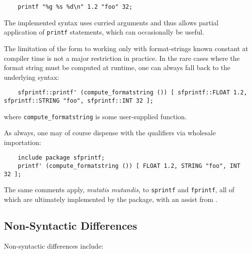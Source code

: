\begin{verbatim}
    printf "%g %s %d\n" 1.2 "foo" 32;
\end{verbatim}

The implemented syntax uses curried arguments and thus allows partial 
application of {\tt printf} statements, which can occasionally be useful.

The limitation of the form to working only with format-strings 
known constant at compiler time is not a major restriction in practice. 
In the rare cases where the format string must be computed at runtime, 
one can always fall back to the underlying syntax: 

\begin{verbatim}
    sfprintf::printf' (compute_formatstring ()) [ sfprintf::FLOAT 1.2, sfprintf::STRING "foo", sfprintf::INT 32 ];
\end{verbatim}

where {\tt compute\_formatstring} is some user-supplied function. 

As always, one may of course dispense with the qualifiers via wholesale importation: 
\begin{verbatim}
    include package sfprintf;
    printf' (compute_formatstring ()) [ FLOAT 1.2, STRING "foo", INT 32 ];
\end{verbatim}


The same comments apply, {\it mutatis mutandis,}  to {\tt sprintf} and {\tt fprintf}, all of which are ultimately implemented by the 
 package, with an assist from 
.

\cutend*

\subsection{Non-Syntactic Differences}
Non-syntactic differences include:

